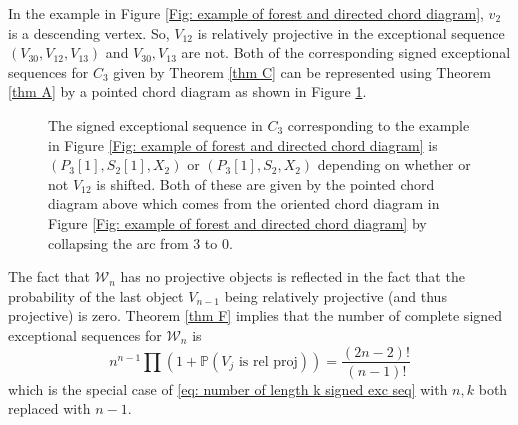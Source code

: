 \documentclass[11pt]{amsart}
\theoremstyle{definition}
\theoremstyle{remark}
\numberwithin{equation}{section}
\newcommand{\field}[1]{\mathbb{#1}}
\newcommand{\PP}{\ensuremath{{\field{P}}}}
\newcommand{\cW}{\ensuremath{{\mathcal{W}}}}
\begin{document}
In the example in Figure \ref{Fig: example of forest and directed chord diagram}, $v_2$ is a descending vertex. So, $V_{12}$ is relatively projective in the exceptional sequence $(V_{30},V_{12},V_{13})$ and $V_{30},V_{13}$ are not. Both of the corresponding signed exceptional sequences for $C_3$ given by Theorem \ref{thm C} can be represented using Theorem \ref{thm A} by a pointed chord diagram as shown in Figure \ref{Fig: sin exc seq in C3}.
%
\begin{figure}[htbp]
\begin{center}
\caption{The signed exceptional sequence in $C_3$ corresponding to the example in Figure \ref{Fig: example of forest and directed chord diagram} is $(P_3[1],S_2[1],X_2)$ or $(P_3[1],S_2,X_2)$ depending on whether or not $V_{12}$ is shifted. Both of these are given by the pointed chord diagram above which comes from the oriented chord diagram in Figure \ref{Fig: example of forest and directed chord diagram} by collapsing the arc from 3 to 0.}
\label{Fig: sin exc seq in C3}
\end{center}
\end{figure}
%

The fact that $\cW_n$ has no projective objects is reflected in the fact that the probability of the last object $V_{n-1}$ being relatively projective (and thus projective) is zero. Theorem \ref{thm F} implies that the number of complete signed exceptional sequences for $\cW_n$ is
\[
	n^{n-1}\prod (1+\PP(V_j\text{ is rel proj}))=\frac{(2n-2)!}{(n-1)!}
\]
which is the special case of \eqref{eq: number of length k signed exc seq} with $n,k$ both replaced with $n-1$.
\end{document}
